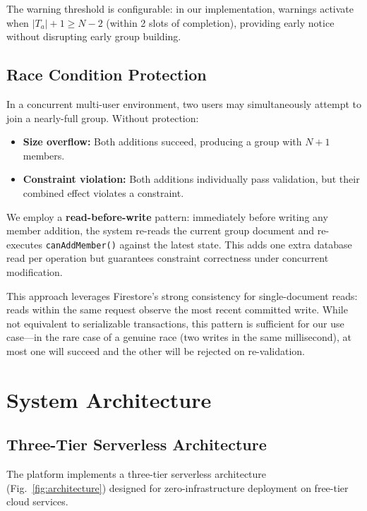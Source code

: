 \documentclass[11pt,a4paper]{article}
\theoremstyle{plain}
\theoremstyle{definition}
\begin{document}
The warning threshold is configurable: in our implementation, warnings activate when $|T_a| + 1 \geq N - 2$ (within 2 slots of completion), providing early notice without disrupting early group building.

\subsection{Race Condition Protection}

In a concurrent multi-user environment, two users may simultaneously attempt to join a nearly-full group. Without protection:
\begin{itemize}[noitemsep,topsep=3pt]
    \item \textbf{Size overflow:} Both additions succeed, producing a group with $N+1$ members.
    \item \textbf{Constraint violation:} Both additions individually pass validation, but their combined effect violates a constraint.
\end{itemize}

We employ a \textbf{read-before-write} pattern: immediately before writing any member addition, the system re-reads the current group document and re-executes \texttt{canAddMember()} against the latest state. This adds one extra database read per operation but guarantees constraint correctness under concurrent modification.

This approach leverages Firestore's strong consistency for single-document reads: reads within the same request observe the most recent committed write. While not equivalent to serializable transactions, this pattern is sufficient for our use case---in the rare case of a genuine race (two writes in the same millisecond), at most one will succeed and the other will be rejected on re-validation.

\section{System Architecture}
\label{sec:architecture}

\subsection{Three-Tier Serverless Architecture}

The platform implements a three-tier serverless architecture (Fig.~\ref{fig:architecture}) designed for zero-infrastructure deployment on free-tier cloud services.
\end{document}
